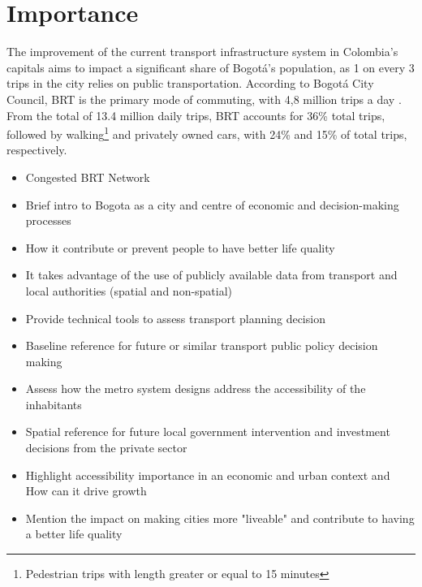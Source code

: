 \documentclass[12pt, a4paper]{report}
\begin{document}

\section{Importance}

The improvement of the current transport infrastructure system in Colombia's capitals aims to impact a significant share of Bogot\'{a}'s population, as 1 on every 3 trips in the city relies on public transportation. According to Bogot\'{a} City Council, BRT is the primary mode of commuting, with 4,8 million trips a day \citep{alcaldiadebogotaEncuestaMovilidad20192019}. From the total of 13.4 million daily trips, BRT accounts for 36\% total trips, followed by walking\footnote{Pedestrian trips with length greater or equal to 15 minutes} and privately owned cars, with 24\% and 15\% of total trips, respectively.



\begin{itemize}

\item Congested BRT Network

\item Brief intro to Bogota as a city and centre of economic and decision-making processes
\item How it contribute or prevent people to have better life quality
\item It takes advantage of the use of publicly available data from transport and local authorities (spatial and non-spatial)
  \item Provide technical tools to assess transport planning decision
  \item Baseline reference for future or similar transport public policy decision making
  \item Assess how the metro system designs address the accessibility of the inhabitants
  \item Spatial reference for future local government intervention and investment decisions from the private sector
  \item Highlight accessibility importance in an economic and urban context and How can it drive growth
  \item Mention the impact on making cities more "liveable" and contribute to having a better life quality
\end{itemize}
\end{document}
